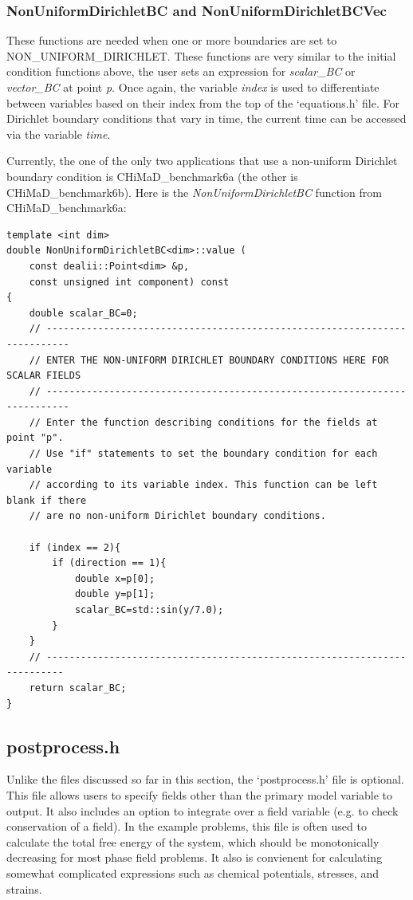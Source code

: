 \documentclass[10pt]{article} %
\begin{document}
\subsubsection{NonUniformDirichletBC and NonUniformDirichletBCVec}
These functions are needed when one or more boundaries are set to NON\_UNIFORM\_DIRICHLET. These functions are very similar to the initial condition functions above, the user sets an expression for \emph{scalar\_BC} or \emph{vector\_BC} at point \emph{p}. Once again, the variable \emph{index} is used to differentiate between variables based on their index from the top of the `equations.h' file. For Dirichlet boundary conditions that vary in time, the current time can be accessed via the variable \emph{time}.

Currently, the one of the only two applications that use a non-uniform Dirichlet boundary condition is CHiMaD\_benchmark6a (the other is CHiMaD\_benchmark6b). Here is the \emph{NonUniformDirichletBC} function from CHiMaD\_benchmark6a:
\scriptsize
\begin{lstlisting}
template <int dim>
double NonUniformDirichletBC<dim>::value (
	const dealii::Point<dim> &p, 
	const unsigned int component) const
{
    double scalar_BC=0;
    // --------------------------------------------------------------------------
    // ENTER THE NON-UNIFORM DIRICHLET BOUNDARY CONDITIONS HERE FOR SCALAR FIELDS
    // --------------------------------------------------------------------------
    // Enter the function describing conditions for the fields at point "p".
    // Use "if" statements to set the boundary condition for each variable
    // according to its variable index. This function can be left blank if there
    // are no non-uniform Dirichlet boundary conditions.
    
    if (index == 2){
        if (direction == 1){
            double x=p[0];
            double y=p[1];
            scalar_BC=std::sin(y/7.0);
        }
    }
    // -------------------------------------------------------------------------
    return scalar_BC;
}
\end{lstlisting}
\normalsize

\subsection{postprocess.h}
Unlike the files discussed so far in this section, the `postprocess.h' file is optional. This file allows users to specify fields other than the primary model variable to output. It also includes an option to integrate over a field variable (e.g. to check conservation of a field). In the example problems, this file is often used to calculate the total free energy of the system, which should be monotonically decreasing for most phase field problems. It also is convienent for calculating somewhat complicated expressions such as chemical potentials, stresses, and strains.
\end{document}
